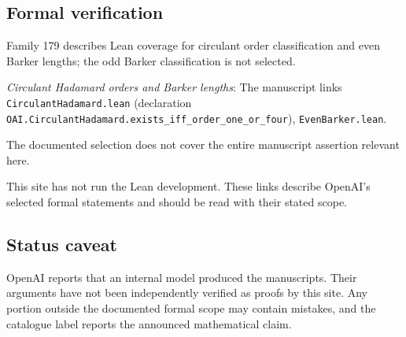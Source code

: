 \documentclass[11pt]{article}
\begin{document}
\subsection{Formal verification}
Family 179 describes Lean coverage for circulant order classification and even Barker lengths; the odd Barker classification is not selected.

\textit{Circulant Hadamard orders and Barker lengths}: The manuscript links \texttt{CirculantHadamard.lean} (declaration \texttt{OAI.CirculantHadamard.exists\_iff\_order\_one\_or\_four}), \texttt{EvenBarker.lean}.

The documented selection does not cover the entire manuscript assertion relevant here.

This site has not run the Lean development. These links describe OpenAI’s selected formal statements and should be read with their stated scope.

\subsection{Status caveat}
OpenAI reports that an internal model produced the manuscripts. Their arguments have not been independently verified as proofs by this site. Any portion outside the documented formal scope may contain mistakes, and the catalogue label reports the announced mathematical claim.
\end{document}
